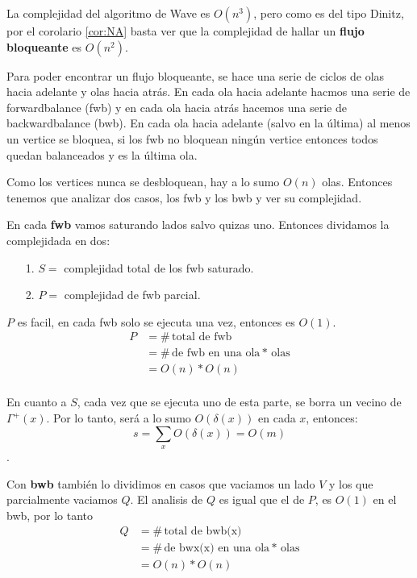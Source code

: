 \documentclass[12pt,a4paper]{article}
\begin{document}
La complejidad del algoritmo de Wave es $O(n^{3})$, pero como es del tipo 
Dinitz, por el corolario \ref{cor:NA} basta ver que la complejidad de hallar un
\textbf{flujo bloqueante} es $O(n^{2})$.
\medskip

Para poder encontrar un flujo bloqueante, se hace una serie de ciclos de olas 
hacia adelante y olas hacia atrás. En cada ola hacia adelante hacmos una serie 
de forwardbalance (fwb) y en cada ola hacia atrás hacemos una serie de
backwardbalance (bwb). En cada ola hacia adelante (salvo en la última) al menos 
un vertice se bloquea, si los fwb no bloquean ningún vertice entonces todos 
quedan balanceados y es la última ola.
\medskip

Como los vertices nunca se desbloquean, hay a lo sumo $O(n)$ olas. Entonces tenemos 
que analizar dos casos, los fwb y los bwb y ver su complejidad. 
\medskip

En cada \textbf{fwb} vamos saturando lados salvo quizas uno. Entonces dividamos la 
complejidada en dos:
\begin{itemize}
    \item [1.] $S=$ complejidad total de los fwb saturado.
    \item [2.] $P=$ complejidad de fwb parcial.
\end{itemize}

$P$ es facil, en cada fwb solo se ejecuta una vez, entonces es $O(1)$.
\begin{align*}
    P &= \#\,\text{total de fwb}\\
    &= \#\,\text{de fwb en una ola} * \,\text{olas}\\
    &= O(n) * O(n)\\
\end{align*}

En cuanto a $S$, cada vez que se ejecuta uno de esta parte, se borra un vecino de 
$\Gamma^{+}(x)$. Por lo tanto, será a lo sumo $O(\delta(x))$ en cada $x$, entonces:
$$s = \sum_{x} O(\delta(x)) = O(m)$$.
\medskip

Con \textbf{bwb} también lo dividimos en casos que vaciamos un lado $V$ y 
los que parcialmente vaciamos $Q$. El analisis de $Q$ es igual que el de $P$, es 
$O(1)$ en el bwb, por lo tanto
\begin{align*}
    Q &= \#\,\text{total de bwb(x)}\\
    &= \#\,\text{de bwx(x) en una ola} * \,\text{olas}\\
    &= O(n) * O(n)\\
\end{align*}
\end{document}
